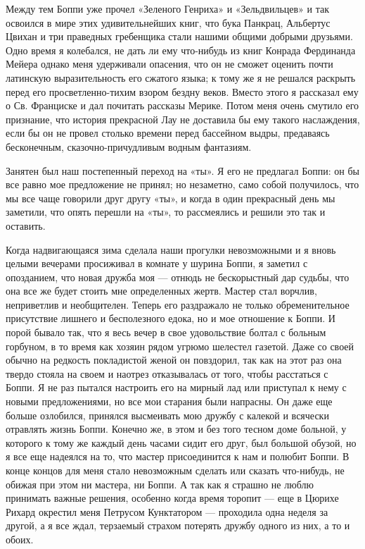 Между  тем Боппи  уже  прочел «Зеленого  Генриха»  и «Зельдвильцев»  и
так  освоился в  мире  этих удивительнейших  книг,  что бука  Панкрац,
Альбертус  Цвихан  и  три  праведных гребенщика  стали  нашими  общими
добрыми друзьями. Одно время я колебался, не дать ли ему что-нибудь из
книг Конрада Фердинанда Мейера однако меня удерживали опасения, что он
не сможет оценить почти латинскую выразительность его сжатого языка; к
тому  же я  не решался  раскрыть перед  его просветленно-тихим  взором
бездну  веков. Вместо  этого я  рассказал ему  о Св.  Франциске и  дал
почитать рассказы Мерике. Потом меня  очень смутило его признание, что
история прекрасной Лау не доставила бы ему такого наслаждения, если бы
он  не  провел  столько  времени  перед  бассейном  выдры,  предаваясь
бесконечным, сказочно-причудливым водным фантазиям.

Занятен был наш постепенный переход на «ты». Я его не предлагал Боппи:
он бы  все равно мое предложение  не принял; но незаметно,  само собой
получилось, что мы  все чаще говорили друг другу «ты»,  и когда в один
прекрасный день мы заметили, что опять перешли на «ты», то рассмеялись
и решили это так и оставить.

Когда надвигающаяся зима сделала наши  прогулки невозможными и я вновь
целыми  вечерами просиживал  в комнате  у  шурина Боппи,  я заметил  с
опозданием,  что  новая дружба  моя  ---  отнюдь не  бескорыстный  дар
судьбы, что  она все  же будет стоить  мне определенных  жертв. Мастер
стал  ворчлив, неприветлив  и  необщителен. Теперь  его раздражало  не
только обременительное присутствие лишнего  и бесполезного едока, но и
мое отношение  к Боппи. И  порой бывало так, что  я весь вечер  в свое
удовольствие болтал  с больным горбуном,  в то время как  хозяин рядом
угрюмо шелестел газетой. Даже со  своей обычно на редкость покладистой
женой он повздорил, так  как на этот раз она твердо  стояла на своем и
наотрез  отказывалась от  того, чтобы  расстаться  с Боппи.  Я не  раз
пытался настроить  его на  мирный лад  или приступал  к нему  с новыми
предложениями, но все  мои старания были напрасны. Он  даже еще больше
озлобился,  принялся  высмеивать  мою  дружбу  с  калекой  и  всячески
отравлять  жизнь Боппи.  Конечно же,  в этом  и без  того тесном  доме
больной, у которого  к тому же каждый день часами  сидит его друг, был
большой обузой, но я все еще  надеялся на то, что мастер присоединится
к  нам и  полюбит Боппи.  В конце  концов для  меня стало  невозможным
сделать  или сказать  что-нибудь, не  обижая при  этом ни  мастера, ни
Боппи. А так как я страшно не люблю принимать важные решения, особенно
когда время  торопит ---  еще в Цюрихе  Рихард окрестил  меня Петрусом
Кунктатором  ---  проходила одна  неделя  за  другой,  а я  все  ждал,
терзаемый страхом потерять дружбу одного из них, а то и обоих.

